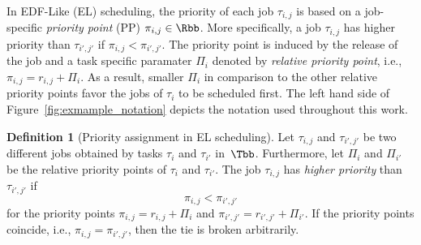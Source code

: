 \documentclass[conference]{IEEEtran}
\theoremstyle{definition}
\newtheorem{defn}[thm]{Definition}
\theoremstyle{remark}
\begin{document}

In EDF-Like (EL) scheduling, the priority of each job $\tau_{i,j}$ is based on a job-specific \emph{priority point} (PP) $\pi_{i,j} \in \Rbb$.
More specifically, a job $\tau_{i,j}$ has higher priority than $\tau_{i',j'}$ if  $\pi_{i,j}<\pi_{i',j'}$.
The priority point is induced by the release of the job and a task specific paramater $\Pi_i$ denoted by \emph{relative priority point}, i.e., $\pi_{i,j} = r_{i,j} + \Pi_i$.
As a result, smaller $\Pi_i$ in comparison to the other relative priority points favor the jobs of $\tau_i$ to be scheduled first.
%
The left hand side of Figure~\ref{fig:exmample_notation} depicts the notation used throughout this work.

\begin{defn}[Priority assignment in EL scheduling]
	\label{defn:priority_rp}
	Let $\tau_{i,j}$ and $\tau_{i',j'}$ be two different jobs obtained by tasks $\tau_i$ and $\tau_{i'}$ in~$\Tbb$.
	Furthermore, let $\Pi_i$ and $\Pi_{i'}$ be the relative priority points of $\tau_i$ and $\tau_{i'}$.
	The job $\tau_{i,j}$ has \emph{higher priority} than $\tau_{i',j'}$ if
	\begin{equation}
		\pi_{i,j} %
		< \pi_{i',j'} %
	\end{equation}
	for the priority points $\pi_{i,j} = r_{i,j} + \Pi_i$ and $\pi_{i',j'} = r_{i',j'} + \Pi_{i'}$.
	If the priority points coincide, i.e., $\pi_{i,j} = \pi_{i',j'}$, then the 
	tie is broken arbitrarily.
\end{defn}
\end{document}
